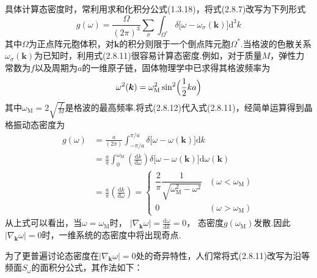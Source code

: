 具体计算态密度时，常利用求和化积分公式(1.3.18)，将式(2.8.7)改写为下列形式
\begin{equation}
  g(\omega)=\frac{\Omega}{(2\pi)^3}\sum_{\sigma}
  \int_{\Omega^{*}}\delta\bigl[\omega-\omega_{\sigma}(\boldsymbol{k})\bigr]\mathrm{d}^3k
\end{equation}
其中$\Omega$为正点阵元胞体积，对$\boldsymbol{k}$的积分则限于一个倒点阵元胞$\Omega^{*}$.当格波的色散关系$\omega_{\sigma}(\boldsymbol{k})$为已知时，利用式(2.8.11)很容易计算态密度.例如，对于质量$M$，弹性力常数为$f$以及周期为$a$的一维原子链，固体物理学中已求得其格波频率为
\begin{equation}
  \omega^2(\boldsymbol{k})=\omega_{\mathrm{M}}^2
  \sin^2\Bigl(\frac{1}{2}ka\Bigr)
\end{equation}
其中$\omega_{\mathrm{M}}=2\sqrt{\frac{f}{M}}$是格波的最高频率.将式(2.8.12)代入式(2.8.11)，经简单运算得到晶格振动态密度为
\begin{equation}
\begin{aligned}
  g(\omega)&=\frac{a}{(2\pi)}\int_{-\pi/a}^{\pi/a}
  \delta\bigl[\omega-\omega(\boldsymbol{k})\bigr]\mathrm{d}k\\
  &=\frac{a}{\pi}\int_0^{\omega_{\mathrm{M}}}
  \left(\frac{\mathrm{d}k}{\mathrm{d}\omega}\right)
  \delta\bigl[\omega-\omega(\boldsymbol{k})\bigr]\mathrm{d}\omega(\boldsymbol{k})\\
  &=\frac{a}{\pi}\left(\frac{\mathrm{d}k}{\mathrm{d}\omega}\right)
  =\begin{cases}
  \dfrac{2}{\pi}\dfrac{1}{\sqrt{\omega_{\mathrm{M}}^2-\omega^2}}
  &(\omega<\omega_{\mathrm{M}})\\[3ex]
  0&(\omega>\omega_{\mathrm{M}})
  \end{cases}
\end{aligned}
\end{equation}
从上式可以看出，当$\omega=\omega_{\mathrm{M}}$时，
$|\nabla_{\boldsymbol{k}}\omega|=\frac{\mathrm{d}\omega}{\mathrm{d}k}=0$，
态密度$g(\omega_{\mathrm{M}})$发散.因此$|\nabla_{\boldsymbol{k}}\omega|=0$时，一维系统的态密度中将出现奇点.

为了更普遍讨论态密度在$|\nabla_{\boldsymbol{k}}\omega|=0$处的奇异特性，人们常将式(2.8.11)改写为沿等频面$S_{\omega}$的面积分公式，其作法如下：

